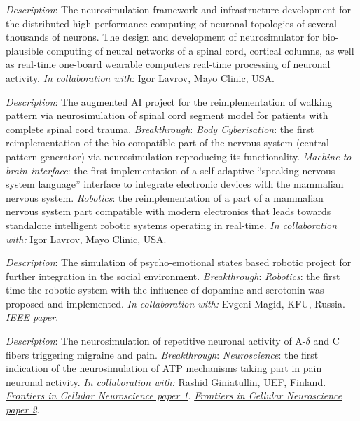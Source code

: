 \documentclass{moderncv}
\begin{document}
    {\small \emph{Description}: The neurosimulation framework and infrastructure development for the distributed high-performance computing of neuronal topologies of several thousands of neurons.
    The design and development of neurosimulator for bio-plausible computing of neural networks of a spinal cord, cortical columns, as well as real-time one-board wearable computers real-time processing of neuronal activity.
    \emph{In collaboration with:} Igor Lavrov, Mayo Clinic, USA.}
    
    {\small \emph{Description}: The augmented AI project for the reimplementation of walking pattern via neurosimulation of spinal cord segment model for patients with complete spinal cord trauma. \newline{}
    \emph{Breakthrough}:
    \emph{Body Cyberisation}: the first reimplementation of the bio-compatible part of the nervous system (central pattern generator) via neurosimulation reproducing its functionality.
    \emph{Machine to brain interface}: the first implementation of a self-adaptive ``speaking nervous system language'' interface to integrate electronic devices with the mammalian nervous system.
    \emph{Robotics}: the reimplementation of a part of a mammalian nervous system part compatible with modern electronics that leads towards standalone intelligent robotic systems operating in real-time.
    \emph{In collaboration with:} Igor Lavrov, Mayo Clinic, USA.}

    {\small \emph{Description}: The simulation of psycho-emotional states based robotic project for further integration in the social environment. \newline{}
    \emph{Breakthrough}:
    \emph{Robotics}: the first time the robotic system with the influence of dopamine and serotonin was proposed and implemented.
    \emph{In collaboration with:} Evgeni Magid, KFU, Russia.
    \href{https://ieeexplore.ieee.org/document/9073255}{\emph{IEEE paper}}.}

    {\small \emph{Description}: The neurosimulation of repetitive neuronal activity of A-$\delta$ and C fibers triggering migraine and pain. \newline{}
    \emph{Breakthrough}:
    \emph{Neuroscience}: the first indication of the neurosimulation of ATP mechanisms taking part in pain neuronal activity.
    \emph{In collaboration with:} Rashid Giniatullin, UEF, Finland.
    \href{https://www.frontiersin.org/articles/10.3389/fncel.2020.00135/full}{\emph{Frontiers in Cellular Neuroscience paper 1}}.
    \href{https://www.frontiersin.org/articles/10.3389/fncel.2021.644047/full}{\emph{Frontiers in Cellular Neuroscience paper 2}}.
    }
\end{document}
